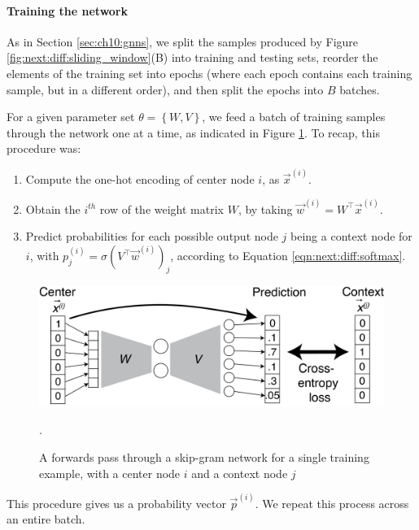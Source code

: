 \paragraph*{Training the network}

As in Section \ref{sec:ch10:gnns}, we split the samples produced by Figure \ref{fig:next:diff:sliding_window}(B) into training and testing sets, reorder the elements of the training set into epochs (where each epoch contains each training sample, but in a different order), and then split the epochs into $B$ batches.

For a given parameter set $\theta = \left\{W, V\right\}$, we feed a batch of training samples through the network one at a time, as indicated in Figure \ref{fig:next:diff:sgtraining}. To recap, this procedure was:
\begin{enumerate}
    \item Compute the one-hot encoding of center node $i$, as $\vec x^{(i)}$.
    \item Obtain the $i^{th}$ row of the weight matrix $W$, by taking $\vec w^{(i)} = W^\top \vec x^{(i)}$.
    \item Predict probabilities for each possible output node $j$ being a context node for $i$, with $p^{(i)}_j = \sigma\left(V^\top \vec w^{(i)}\right)_j$, according to Equation \eqref{eqn:next:diff:softmax}.
\end{enumerate}

\begin{figure}
    \centering
    \includegraphics[width=\linewidth]{next/Images/skipgram_forward.png}
    \caption[Forwards pass through a skip-gram network.]{A forwards pass through a skip-gram network for a single training example, with a center node $i$ and a context node $j$}.
    \label{fig:next:diff:sgtraining}
\end{figure}

This procedure gives us a probability vector $\vec p^{(i)}$. We repeat this process across an entire batch.

